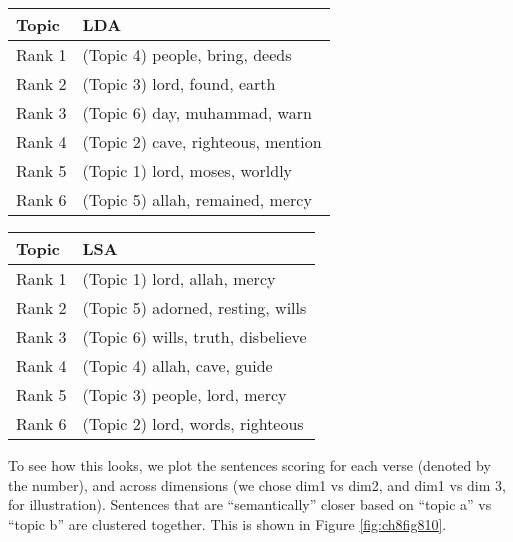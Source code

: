 \documentclass[
]{article}
\begin{document}
\begin{longtable}[]{@{}ll@{}}
\toprule\noalign{}
Topic & LDA \\
\midrule\noalign{}
\endhead
\bottomrule\noalign{}
\endlastfoot
Rank 1 & (Topic 4) people, bring, deeds \\
Rank 2 & (Topic 3) lord, found, earth \\
Rank 3 & (Topic 6) day, muhammad, warn \\
Rank 4 & (Topic 2) cave, righteous, mention \\
Rank 5 & (Topic 1) lord, moses, worldly \\
Rank 6 & (Topic 5) allah, remained, mercy \\
\end{longtable}

\begin{longtable}[]{@{}ll@{}}
\toprule\noalign{}
Topic & LSA \\
\midrule\noalign{}
\endhead
\bottomrule\noalign{}
\endlastfoot
Rank 1 & (Topic 1) lord, allah, mercy \\
Rank 2 & (Topic 5) adorned, resting, wills \\
Rank 3 & (Topic 6) wills, truth, disbelieve \\
Rank 4 & (Topic 4) allah, cave, guide \\
Rank 5 & (Topic 3) people, lord, mercy \\
Rank 6 & (Topic 2) lord, words, righteous \\
\end{longtable}

To see how this looks, we plot the sentences scoring for each verse (denoted by the number), and across dimensions (we chose dim1 vs dim2, and dim1 vs dim 3, for illustration). Sentences that are ``semantically'' closer based on ``topic a'' vs ``topic b'' are clustered together. This is shown in Figure \ref{fig:ch8fig810}.
\end{document}
